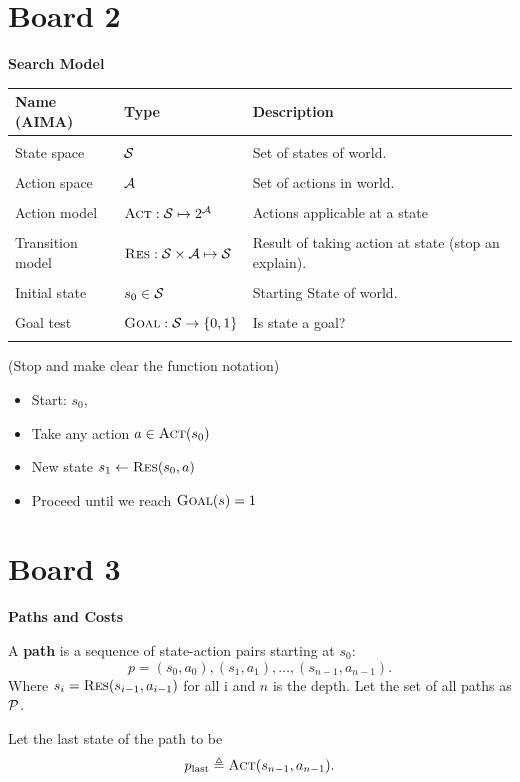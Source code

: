 \documentclass[10pt]{article}
\begin{document}
\section{Board 2}
 \air
\textbf{Search Model}
\begin{center}
\begin{tabularx}{\linewidth}{llX}
  \toprule
  Name (AIMA) & Type & Description \\
  \midrule
\\
 State space & $\mathcal{S}$ & Set of states of world. \\\\
 Action space & $\mathcal{A}$& Set of actions in world. \\\\
 Action model&  $\mathrm{\textsc{Act}}: \mathcal{S} \mapsto 2^{\mathcal{A}}$ & Actions applicable at a state \\\\
 Transition model&  $\mathrm{\textsc{Res}}:  \mathcal{S} \times \mathcal{A} \mapsto \mathcal{S} $ &   Result of taking action at state (stop an explain).  \\\\
 Initial state &  $s_0 \in \mathcal{S}$ & Starting State of world.  \\\\
 Goal test& $\mathrm{\textsc{Goal}}: \mathcal{S} \rightarrow \{0, 1\}$ & Is state a goal? \\\\
 \bottomrule
\end{tabularx}
\end{center}
(Stop and make clear the function notation)

\air

\begin{itemize}
\item  Start: $s_0$,
\item Take any action $a \in \mathrm{\textsc{Act}}(s_0)$
\item New state $s_1 \gets \mathrm{\textsc{Res}}(s_0, a)$
\item Proceed until we reach $\mathrm{\textsc{Goal}}(s) = 1$
\end{itemize}

\section{Board 3}

\textbf{Paths and Costs}
\begin{defn}
   A \textbf{path}
is a sequence of state-action pairs starting at $s_0$:  \[p = (s_0, a_0), (s_1, a_1), \ldots, (s_{n-1}, a_{n-1}).\] 
\noindent Where $s_i = \mathrm{\textsc{Res}}(s_{i-1}, a_{i-1})$ for all i and $n$ is the depth. 
Let the set of all paths as $\mathcal{P}$.

Let the last state of the path to be  
 \[p_{\mathrm{last}} \triangleq \mathrm{\textsc{Act}}(s_{n-1}, a_{n-1}).\] 

\end{defn}
\end{document}
